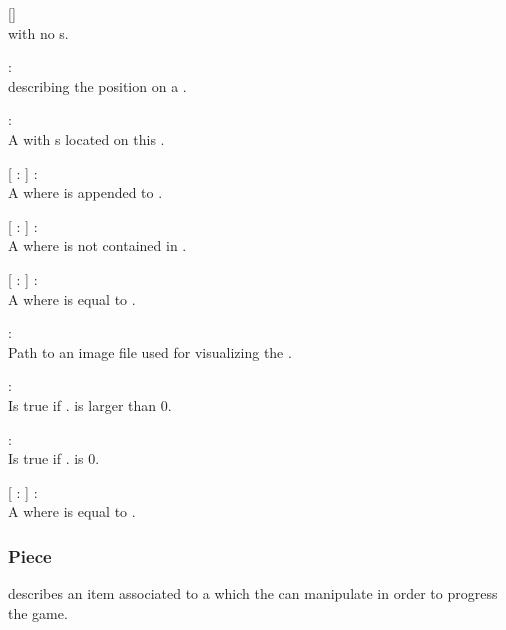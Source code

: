 \begin{dlist}
	\item {}[]\\
	 with no s.
	
	\item {} : \\
	 describing the position on a .
	
	\item {} : \\
	A  with s located on this .
	
	\item {}[  :  ] : \\
	A  where  is appended to .
	
	\item {}[  :  ] : \\
	A  where  is not contained in .
	
	\item {}[  :  ] : \\
	A  where  is equal to .
	
	\item {} : \\
	Path to an image file used for visualizing the .
	
	\item {} : \\
	Is true if . is larger than 0.
	
	\item {} : \\
	Is true if . is 0.
	
	\item {}[  :  ] : \\
	A  where  is equal to .
\end{dlist}

\subsubsection{Piece}
 describes an item associated to a  which the  can manipulate in order to progress the game.

